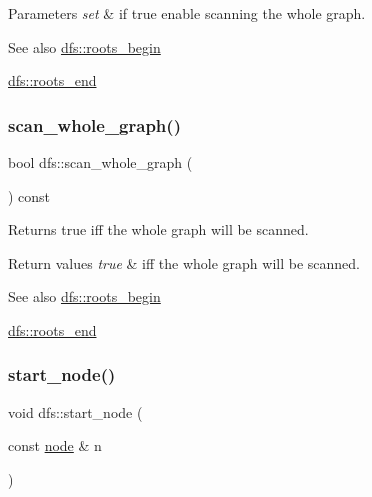 \begin{DoxyParams}{Parameters}
{\em set} & if true enable scanning the whole graph. \\
\hline
\end{DoxyParams}
\begin{DoxySeeAlso}{See also}
\mbox{\hyperlink{classdfs_af56fa2b736f0b924dba1257e18ba4b61}{dfs\+::roots\+\_\+begin}} 

\mbox{\hyperlink{classdfs_ae1a61d8c2d8d99059cab410f766ec73f}{dfs\+::roots\+\_\+end}} 
\end{DoxySeeAlso}
\mbox{\label{classdfs_a025ed2d6101a7b9f72578a52b484ef50}} 
\subsubsection{\texorpdfstring{scan\+\_\+whole\+\_\+graph()}{scan\_whole\_graph()}\hspace{0.1cm}{\footnotesize\ttfamily [2/2]}}
{\footnotesize\ttfamily bool dfs\+::scan\+\_\+whole\+\_\+graph (\begin{DoxyParamCaption}{ }\end{DoxyParamCaption}) const\hspace{0.3cm}{\ttfamily [inline]}}



Returns true iff the whole graph will be scanned. 


\begin{DoxyRetVals}{Return values}
{\em true} & iff the whole graph will be scanned. \\
\hline
\end{DoxyRetVals}
\begin{DoxySeeAlso}{See also}
\mbox{\hyperlink{classdfs_af56fa2b736f0b924dba1257e18ba4b61}{dfs\+::roots\+\_\+begin}} 

\mbox{\hyperlink{classdfs_ae1a61d8c2d8d99059cab410f766ec73f}{dfs\+::roots\+\_\+end}} 
\end{DoxySeeAlso}
\mbox{\label{classdfs_aad21fd0d3036350fd341f877d5747852}} 
\subsubsection{\texorpdfstring{start\+\_\+node()}{start\_node()}\hspace{0.1cm}{\footnotesize\ttfamily [1/2]}}
{\footnotesize\ttfamily void dfs\+::start\+\_\+node (\begin{DoxyParamCaption}\item[{const \mbox{\hyperlink{classnode}{node}} \&}]{n }\end{DoxyParamCaption})\hspace{0.3cm}{\ttfamily [inline]}}



